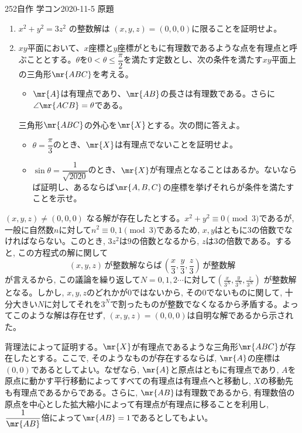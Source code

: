 \begin{prob}{252}{\maru}{自作 学コン2020-11-5 原題}
 \begin{enumerate}
  \item $x^2+y^2=3z^2$ の整数解は $(x,y,z)=(0,0,0)$に限ることを証明せよ。
  \item $xy$平面において、$x$座標と$y$座標がともに有理数であるような点を有理点と呼ぶこととする。$\theta$を$0<\theta\le\dfrac{\pi}{2}$を満たす定数とし、次の条件を満たす$xy$平面上の三角形$\mr{ABC}$を考える。
  \begin{itemize}
   \item[(条件)] $\mr{A}$は有理点であり、$\mr{AB}$の長さは有理数である。さらに$\angle\mr{ACB}=\theta$である。
  \end{itemize}
  三角形$\mr{ABC}$の外心を$\mr{X}$とする。次の問に答えよ。
  \begin{itemize}
   \item[(a)] $\theta=\dfrac{\pi}{3}$のとき、$\mr{X}$は有理点でないことを証明せよ。
   \item[(b)] $\sin\theta=\dfrac{1}{\sqrt{2020}}$のとき、$\mr{X}$が有理点となることはあるか。ないならば証明し、あるならば$\mr{A,B,C}$の座標を挙げそれらが条件を満たすことを示せ。 
  \end{itemize}
 \end{enumerate}
\end{prob}
$(x,y,z) \neq (0,0,0)$ なる解が存在したとする。$x^2 + y^2\equiv 0\pmod{3}$であるが, 一般に自然数$n$に対して$n^2\equiv 0,1\pmod{3}$であるため, $x,y$はともに$3$の倍数でなければならない。このとき, $3z^2$は$9$の倍数となるから, $z$は$3$の倍数である。すると, この方程式の解に関して
\[(x,y,z) \,\text{が整数解ならば} \,\left(\frac{x}{3}, \frac{y}{3}, \frac{z}{3}\right) \,\text{が整数解} \]
が言えるから, この議論を繰り返して$N=0,1,2\cdots$に対して$(\frac{x}{3^{N}}, \frac{y}{3^{N}}, \frac{z}{3^{N}})$ が整数解となる。しかし, $x,y,z$のどれかが$0$ではないから, その$0$でないものに関して, 十分大きい$N$に対してそれを$3^{N}$で割ったものが整数でなくなるから矛盾する。よってこのような解は存在せず, $(x,y,z) = (0,0,0)$は自明な解であるから示された。

背理法によって証明する。$\mr{X}$が有理点であるような三角形$\mr{ABC}$が存在したとする。ここで, そのようなものが存在するならば, $\mr{A}$の座標は$(0,0)$であるとしてよい。なぜなら, $\mr{A}$と原点はともに有理点であり, $A$を原点に動かす平行移動によってすべての有理点は有理点へと移動し, $X$の移動先も有理点であるからである。さらに, $\mr{AB}$は有理数であるから, 有理数倍の原点を中心とした拡大縮小によって有理点が有理点に移ることを利用し, $\dfrac{1}{\mr{AB}}$倍によって$\mr{AB}=1$であるとしてもよい。

